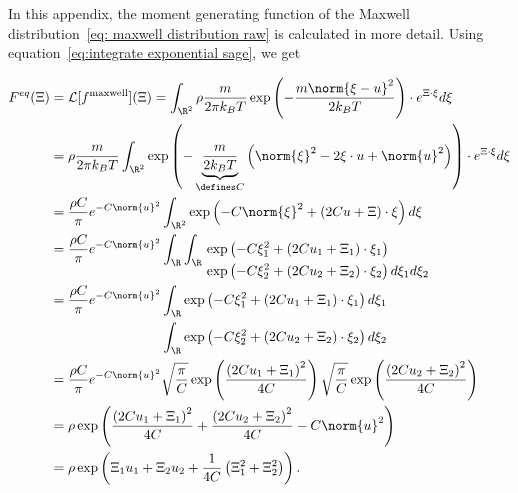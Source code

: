 In this appendix, the moment generating function of the Maxwell distribution~\eqref{eq: maxwell distribution raw} is calculated in more detail.
Using equation~\eqref{eq:integrate exponential sage}, we get

\begin{equation*}
  \begin{aligned}
    F^{eq}(\Xi) & = \mathcal{L}[f^{\text{maxwell}}](\Xi)
    = \int_{\R^2} \rho \frac{m}{2\pi k_B T} \exp \left( - \frac{m\norm{\xi-u}^2}{2 k_B T}\right) \cdot e^{\Xi\cdot\xi} d\xi \\
    & = \rho  \frac{m}{2\pi k_B T} \int_{\R^2}
      \exp \left( - \underbrace{\frac{m}{2 k_B T}}_{\defines C} \left( \norm{\xi}^2 - 2\xi\cdot u + \norm{u}^2 \right)\right) \cdot e^{\Xi\cdot\xi} d\xi \\
    & = \frac{\rho C} {\pi} e^{-C \norm{u}^2}
      \int_{\R^2}
      \exp \left( - C\norm{\xi}^2 + (2Cu + \Xi)\cdot\xi \right) d\xi \\
    & =  \frac{\rho C} {\pi} e^{-C \norm{u}^2}
      \int_{\R} \int_{\R}
      \begin{aligned}[t]
      &\exp \left( - C \xi_1^2 + (2Cu_1 + \Xi_1)\cdot\xi_1 \right) \\
      &\exp \left( - C\xi_2^2 + (2Cu_2 + \Xi_2)\cdot\xi_2 \right) d\xi_1 d\xi_2
      \end{aligned}\\
    & = \frac{\rho C} {\pi} e^{-C \norm{u}^2}
      \begin{aligned}[t]
        &\int_{\R}
        \exp \left( - C\xi_1^2 + (2Cu_1 + \Xi_1)\cdot\xi_1 \right) d\xi_1 \\
        &\int_{\R}
        \exp \left( - C\xi_2^2 + (2Cu_2 + \Xi_2)\cdot\xi_2 \right) d\xi_2
      \end{aligned}\\
    & = \frac{\rho C} {\pi} e^{-C \norm{u}^2}
      \sqrt{\frac{\pi}{C}}\exp \left( \frac{{(2Cu_1 + \Xi_1)}^2}{4C}\right)
      \sqrt{\frac{\pi}{C}}\exp \left( \frac{{(2Cu_2 + \Xi_2)}^2}{4C}\right) \\
    & = \rho
      \exp \left( \frac{{(2Cu_1 + \Xi_1)}^2}{4C} + \frac{{(2Cu_2 + \Xi_2)}^2}{4C} -C \norm{u}^2 \right) \\
    & = \rho
      \exp \left( \Xi_1 u_1 + \Xi_2 u_2 + \frac{1}{4C}\left(\Xi_1^2 + \Xi_2^2 \right)\right).
  \end{aligned}
\end{equation*}
